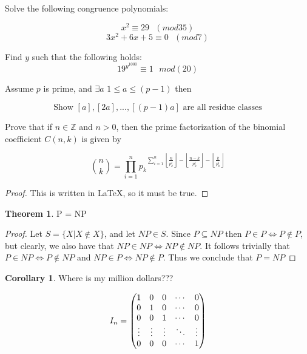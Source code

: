 \documentclass[12pt a]{article}
\providecommand{\floor}[1]{\left \lfloor #1 \right \rfloor}
\theoremstyle{definition}
\newtheorem{corollary}{Corollary}
\newtheorem{thm}{Theorem}
\theoremstyle{definition}
\theoremstyle{definition}
\begin{document}
{Solve the following congruence polynomials:

\begin{equation}
x^2 \equiv 29 \text{ } (mod35)
\end{equation} 
\begin{equation}
3x^2 + 6x + 5 \equiv 0 \text{ } (mod7) 
\end{equation} 

Find $y$ such that the following holds:  
\begin{equation}
	19^{y^{1000}} \equiv 1 \text{ } mod(20) 
\end{equation}

Assume $p$ is prime, and $\exists a$ $1\leq a \leq(p-1)$ then

\begin{equation}
	\text{Show }[a],[2a],...,[(p-1)a] \text{ are all residue classes}
\end{equation}

Prove that if $n\in\mathbb{Z}$ and $n>0$, then the prime factorization of the binomial coefficient $C(n,k)$ is given by 

\begin{equation}
	{n\choose k} = \prod_{i=1}^{n} { {p_{k}}^{\sum_{i=1}^{n} \floor{\frac{n}{p^i_{k}}} -  
			\floor{\frac{n-k}{p^i_{k}}} -  
			\floor{\frac{k}{p^i_{k}}}}  }
\end{equation}

\begin{proof}
This is written in \LaTeX, so it must be true. 
\end{proof}

\newpage


\begin{thm}
P = NP
\end{thm}

\begin{proof}
Let $S =\{X | X \notin X  \}$, and let $NP \in S$. Since $P \subseteq{NP}$ then 
	$P\in P \iff P\notin P$, but clearly, we also have that $NP\in NP \iff NP\notin NP$. It follows trivially that $P\in NP \iff P\notin NP$ and $NP\in P \iff NP\notin P$. 
	Thus we conclude that $P=NP$
\end{proof}

\begin{corollary}
Where is my million dollars???
\end{corollary}

$$I_n = \begin{pmatrix} 1 & 0 & 0 & \cdots & 0 \\ 0 & 1 & 0 & \cdots & 0\\ 0 & 0 & 1 & \cdots & 0 \\ \vdots & \vdots & \vdots & \ddots & \vdots \\ 0 & 0 & 0 & \cdots & 1
\end{pmatrix} \linebreak $$

}
\end{document}
